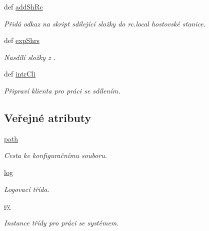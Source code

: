 \begin{DoxyCompactItemize}
def \hyperlink{classShrFol_1_1ShrFol_a04f993258bc66b3f4702891962fbfcd2}{add\-Sh\-Rc}
\begin{DoxyCompactList}\small\item\em Přidá odkaz na skript sdílející složky do rc.\-local hostovské stanice. \end{DoxyCompactList}\item 
def \hyperlink{classShrFol_1_1ShrFol_a115dac3a241b1c02fb8076e30d8b0eed}{exp\-Shrs}
\begin{DoxyCompactList}\small\item\em Nasdílí složky z . \end{DoxyCompactList}\item 
def \hyperlink{classShrFol_1_1ShrFol_a1419a3ffeaca3209922efb5179bf6b44}{intr\-Cli}
\begin{DoxyCompactList}\small\item\em Připraví klienta pro práci se sdílením. \end{DoxyCompactList}\end{DoxyCompactItemize}
\subsection*{Veřejné atributy}
\begin{DoxyCompactItemize}
\item 
\hypertarget{classShrFol_1_1ShrFol_a737b5cea5bb1aac9d1b0a995fd467507}{\hyperlink{classShrFol_1_1ShrFol_a737b5cea5bb1aac9d1b0a995fd467507}{path}}\label{d1/dce/classShrFol_1_1ShrFol_a737b5cea5bb1aac9d1b0a995fd467507}

\begin{DoxyCompactList}\small\item\em Cesta ke konfiguračnímu souboru. \end{DoxyCompactList}\item 
\hypertarget{classShrFol_1_1ShrFol_a9bc63352249879bda2954f8005ee5254}{\hyperlink{classShrFol_1_1ShrFol_a9bc63352249879bda2954f8005ee5254}{log}}\label{d1/dce/classShrFol_1_1ShrFol_a9bc63352249879bda2954f8005ee5254}

\begin{DoxyCompactList}\small\item\em Logovací třída. \end{DoxyCompactList}\item 
\hypertarget{classShrFol_1_1ShrFol_a1d8ffe5f8cdb2cb4d0a0fe4b0455e6ea}{\hyperlink{classShrFol_1_1ShrFol_a1d8ffe5f8cdb2cb4d0a0fe4b0455e6ea}{sy}}\label{d1/dce/classShrFol_1_1ShrFol_a1d8ffe5f8cdb2cb4d0a0fe4b0455e6ea}

\begin{DoxyCompactList}\small\item\em Instance třídy pro práci se systémem. \end{DoxyCompactList}\end{DoxyCompactItemize}


